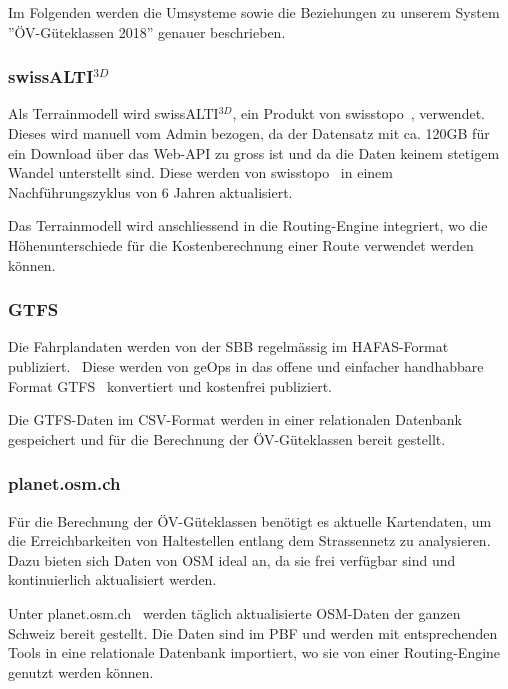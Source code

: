 Im Folgenden werden die Umsysteme sowie die Beziehungen zu unserem System ''ÖV-Güteklassen 2018'' genauer beschrieben.

\subsubsection{swissALTI$^{3D}$}
\label{subsystem:swissALTI3D}

Als \gls{Terrainmodell} wird swissALTI$^{3D}$, ein Produkt von swisstopo~\cite{swissalti3d_swisstopo}, verwendet.
Dieses wird manuell vom Admin bezogen, da der Datensatz mit ca. 120GB für ein Download über das Web-\ac{API} zu gross ist und da die Daten keinem stetigem Wandel unterstellt sind.
Diese werden von swisstopo~\cite{swissalti3d_swisstopo} in einem Nachführungszyklus von 6 Jahren aktualisiert.

Das \gls{Terrainmodell} wird anschliessend in die Routing-Engine integriert, wo die Höhenunterschiede für die Kostenberechnung einer Route verwendet werden können.

\subsubsection{GTFS}
\label{subsystem:GTFS}

Die Fahrplandaten werden von der SBB regelmässig im HAFAS-Format publiziert.~\cite{sbb_hafas_spec}
Diese werden von geOps in das offene und einfacher handhabbare Format \ac{GTFS}~\cite{gtfs_spec} konvertiert und kostenfrei publiziert.~\cite{geops_fahrplandaten}

Die \ac{GTFS}-Daten im CSV-Format werden in einer relationalen Datenbank gespeichert und für die Berechnung der ÖV-Güteklassen bereit gestellt.

\subsubsection{planet.osm.ch}
\label{subsystem:planet.osm.ch}

Für die Berechnung der ÖV-Güteklassen benötigt es aktuelle Kartendaten, um die Erreichbarkeiten von Haltestellen entlang dem Strassennetz zu analysieren.
Dazu bieten sich Daten von \ac{OSM} ideal an, da sie frei verfügbar sind und kontinuierlich aktualisiert werden.

Unter planet.osm.ch~\cite{planet_osm_ch} werden täglich aktualisierte \ac{OSM}-Daten der ganzen Schweiz bereit gestellt.
Die Daten sind im \ac{PBF} und werden mit entsprechenden Tools in eine relationale Datenbank importiert, wo sie von einer Routing-Engine genutzt werden können.


